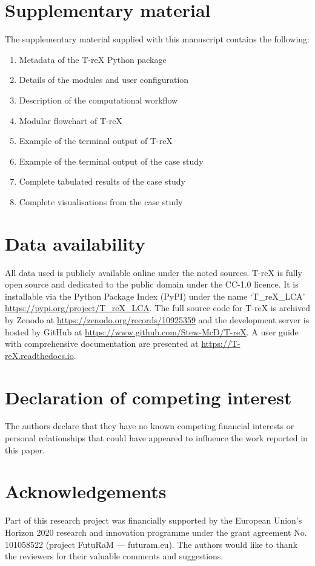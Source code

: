 \documentclass[a4paper,fleqn]{cas-dc}
\begin{document}
\section{Supplementary material}\label{sec:supplementary}
The supplementary material supplied with this manuscript contains the
following:
\begin{enumerate}
	\item Metadata of the T-reX Python package
	\item Details of the modules and user configuration
	\item Description of the computational workflow
	\item Modular flowchart of T-reX
	\item Example of the terminal output of T-reX
	\item Example of the terminal output of the case study
	\item Complete tabulated results of the case study
	\item Complete visualisations from the case study
\end{enumerate}


\section*{Data availability}
All data used is publicly available online under the noted sources. T-reX is fully open source and dedicated to the public domain under the CC-1.0 licence. It is installable via the Python Package Index (PyPI) under the name `T\_reX\_LCA' \url{https://pypi.org/project/T_reX_LCA}.
The full source code for T-reX is archived by Zenodo at \url{https://zenodo.org/records/10925359} 
and the development server is hosted by GitHub at \url{https://www.github.com/Stew-McD/T-reX}. A user guide with comprehensive documentation are presented at \url{https://T-reX.readthedocs.io}.

\section*{Declaration of competing interest}
The authors declare that they have no known competing financial interests or personal relationships that could have appeared to influence the work reported in this paper.

\section*{Acknowledgements}
Part of this research project was financially supported by the European Union's Horizon 2020 research and innovation programme under the grant agreement No. 101058522 (project FutuRaM --- futuram.eu). The authors would like to thank the reviewers for their valuable comments and suggestions.
\end{document}

